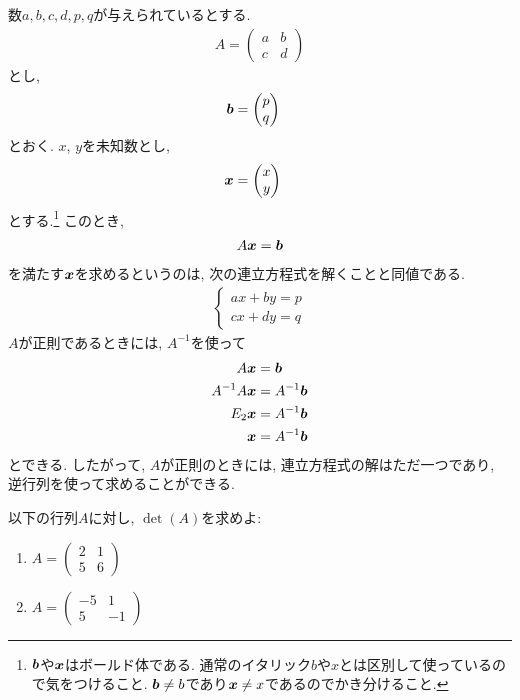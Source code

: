 \begin{remark}
  \label{ex:sle:regcase}
  数$a,b,c,d,p,q$が与えられているとする.
  \begin{align*}
    A=
  \begin{pmatrix}
    a&b\\c&d
  \end{pmatrix}
  \end{align*}
  とし,
  \begin{align*}
      \boldsymbol{b}&=
  \begin{pmatrix}
    p\\q
  \end{pmatrix}  
  \end{align*}
  とおく.
  $x$, $y$を未知数とし,
  \begin{align*}
    \boldsymbol{x}&=
  \begin{pmatrix}
    x\\y
  \end{pmatrix}
  \end{align*}
  とする.\footnote{$\boldsymbol{b}$や$\boldsymbol{x}$はボールド体である.  通常のイタリック$b$や$x$とは区別して使っているので気をつけること.   $\boldsymbol{b}\neq b$であり$\boldsymbol{x}\neq x$であるのでかき分けること.}
  このとき,
  \begin{align*}
    A\boldsymbol{x}=\boldsymbol{b}
  \end{align*}
  を満たす$\boldsymbol{x}$を求めるというのは,
  次の連立方程式を解くことと同値である.
  \begin{align*}
    \begin{cases}
      ax+by=p\\
      cx+dy=q
    \end{cases}
  \end{align*}
  $A$が正則であるときには, $A^{-1}$を使って
  \begin{align*}
    A\boldsymbol{x}&=\boldsymbol{b}\\
    A^{-1}A\boldsymbol{x}&=A^{-1}\boldsymbol{b}\\
    E_2\boldsymbol{x}&=A^{-1}\boldsymbol{b}\\
    \boldsymbol{x}&=A^{-1}\boldsymbol{b}
  \end{align*}
  とできる.
  したがって,
  $A$が正則のときには, 連立方程式の解はただ一つであり,
  逆行列を使って求めることができる.
\end{remark}

\begin{quiz}
  \label{quiz:2:1}
  以下の行列$A$に対し, $\det(A)$を求めよ:
  \begin{enumerate}
  \item
    $A=\begin{pmatrix}2&1\\5&6\end{pmatrix}$
  \item
    $A=\begin{pmatrix}-5&1\\5&-1\end{pmatrix}$
  \end{enumerate}
\end{quiz}

